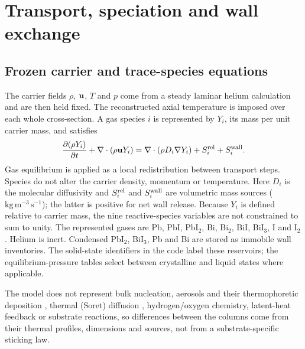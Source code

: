 \section{Transport, speciation and wall exchange}
\label{sec:model}
\subsection{Frozen carrier and trace-species equations}
The carrier fields $\rho$, $\mathbf{u}$, $T$ and $p$ come from a steady
laminar helium calculation and are then held fixed. The reconstructed
axial temperature is imposed over each whole cross-section. A gas
species $i$ is represented by $Y_i$, its mass per unit carrier mass,
and satisfies
\begin{equation}
 \frac{\partial(\rho Y_i)}{\partial t}
 +\nabla\cdot(\rho\mathbf{u}Y_i)
 =\nabla\cdot(\rho D_i\nabla Y_i)+S_i^{\rm rel}+S_i^{\rm wall}.
 \label{eq:transport}
\end{equation}
Gas equilibrium is applied as a local redistribution between transport
steps. Species do not alter the carrier density, momentum or temperature.
Here $D_i$ is the molecular diffusivity and $S_i^{\rm rel}$ and
$S_i^{\rm wall}$ are volumetric mass sources
($\mathrm{kg\,m^{-3}\,s^{-1}}$); the latter is positive for net wall
release. Because $Y_i$ is defined relative to carrier mass, the nine
reactive-species variables are not constrained to sum to unity.
The represented gases are Pb, PbI, PbI$_2$, Bi, Bi$_2$, BiI, BiI$_3$,
I and I$_2$. Helium is inert. Condensed PbI$_2$, BiI$_3$, Pb and Bi
are stored as immobile wall inventories. The solid-state identifiers in
the code label these reservoirs; the equilibrium-pressure tables select
between crystalline and liquid states where applicable.

The model does not represent bulk nucleation, aerosols and their
thermophoretic deposition
\cite{Walker1979thermophoretic,Batchelor1985thermophoretic}, thermal
(Soret) diffusion \cite{Rosner2000heavy,Rosner2007soret},
hydrogen/oxygen chemistry, latent-heat feedback or substrate reactions,
so differences between the columns come from their thermal profiles,
dimensions and sources, not from a substrate-specific sticking law.

